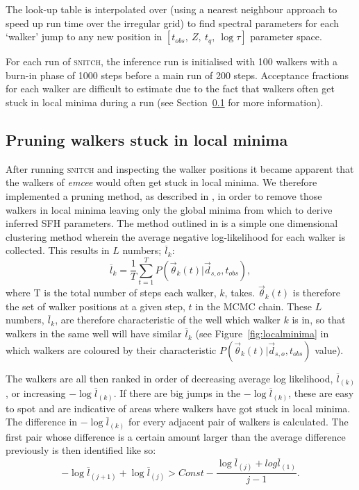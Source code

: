 \documentclass[useAMS,usenatbib]{mn2e}
\begin{document}
 
The look-up table is interpolated over (using a nearest neighbour approach to speed up run time over the irregular grid) to find spectral parameters for each `walker' jump to any new position in $[t_{obs},~Z,~t_q,~\log\tau]$ parameter space. 

For each run of \textsc{snitch}, the inference run is initialised with 100 walkers with a burn-in phase of 1000 steps before a main run of 200 steps. Acceptance fractions for each walker are difficult to estimate due to the fact that walkers often get stuck in local minima during a run (see Section~\ref{sec:pruning} for more information). 



\subsection{Pruning walkers stuck in local minima}\label{sec:pruning}


After running \textsc{snitch} and inspecting the walker positions it became apparent that the walkers of \emph{emcee} would often get stuck in local minima. We therefore implemented a pruning method, as described in \cite{hou12}, in order to remove those walkers in local minima leaving only the global minima from which to derive inferred SFH parameters. The method outlined in \cite{hou12} is a simple one dimensional clustering method wherein the average negative log-likelihood for each walker is collected. This results in $L$ numbers; $\overline{l}_k$:
\begin{equation}\label{eq:lnumbers}
\overline{l}_k = \frac{1}{T} \sum^{T}_{t=1} P(\vec{\theta}_k(t)|\vec{d}_{s,o}, t_{obs}),
\end{equation}
where T is the total number of steps each walker, $k$, takes. $\vec{\theta}_k(t)$ is therefore the set of walker positions at a given step, $t$ in the MCMC chain. These $L$ numbers, $\overline{l}_k$, are therefore characteristic of the well which walker $k$ is in, so that walkers in the same well will have similar $\overline{l}_k$ (see Figure~\ref{fig:localminima} in which walkers are coloured by their characteristic $P(\vec{\theta}_k(t)|\vec{d}_{s,o}, t_{obs})$ value). 


The walkers are all then ranked in order of decreasing average log likelihood, $\overline{l}_{(k)}$, or increasing $- \log \overline{l}_{(k)}$. If there are big jumps in the $- \log \overline{l}_{(k)}$, these are easy to spot and are indicative of areas where walkers have got stuck in local minima. The difference in $- \log \overline{l}_{(k)}$ for every adjacent pair of walkers is calculated. The first pair whose difference is a certain amount larger than the average difference previously is then identified like so:
\begin{equation}\label{eq:idprunes}
-\log \overline{l}_{(j+1)} + \log \overline{l}_{(j)} > Const − \frac{\log \overline{l}_{(j)} + log \overline{l}_{(1)}}{j - 1}.
\end{equation}
\end{document}
